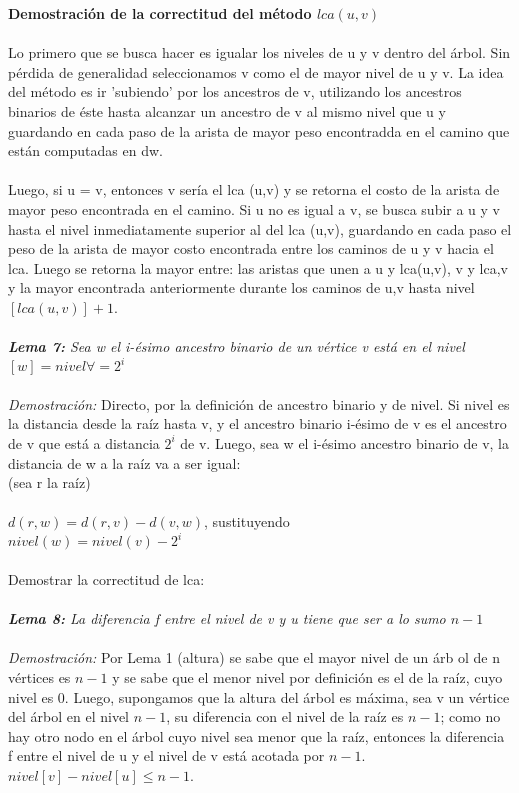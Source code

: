\documentclass[12pt]{article}
\begin{document}
\textbf{Demostraci\'on de la correctitud del m\'etodo $lca(u, v)$}\\
\\
Lo primero que se busca hacer es igualar los niveles de u y v dentro del \'arbol. Sin p\'erdida de generalidad seleccionamos v como el de mayor nivel de u y v. La idea del m\'etodo es ir 'subiendo' por los ancestros de v, utilizando los ancestros binarios de \'este hasta alcanzar un ancestro de v al mismo nivel 	que u y guardando en cada paso de la arista de mayor peso encontradda en el camino que est\'an computadas en dw.\\
\\
Luego, si u = v, entonces v ser\'ia el lca (u,v) y se retorna el costo de la arista de mayor peso encontrada en el camino.  Si u no es igual a v, se busca subir  a u y v hasta el nivel inmediatamente superior al del lca (u,v), guardando en cada paso el peso de la arista de mayor costo encontrada entre
los caminos de u y v hacia el lca.  Luego se retorna la mayor entre: las aristas que unen a u y lca(u,v), v y lca,v y la mayor encontrada anteriormente durante los caminos de u,v hasta nivel $[lca (u,v)] + 1$. \\
\\


\textit{ \textbf{Lema 7:} Sea w el i-\'esimo ancestro binario de un v\'ertice v est\'a en  el nivel $[w] = nivel\forall = 2^i$}\\
\\
\textit{Demostración:} Directo, por la definici\'on de ancestro binario y de nivel.  Si nivel es la distancia desde la ra\'iz hasta v, y el ancestro binario i-\'esimo de v es el ancestro de v que est\'a a distancia $2^i$ de v. Luego,  sea w el i-\'esimo ancestro binario de v, la distancia de w a la ra\'iz va a ser igual:\\
(sea r la ra\'iz)\\
\\
                    $d(r,w) = d(r,v) - d(v,w)$, sustituyendo\\
                    $nivel(w) = nivel (v) - 2^i$\\
\\
Demostrar la correctitud de lca: \\
\\


\textit{ \textbf{Lema 8:} La diferencia f entre el nivel de v y u tiene que ser a lo sumo $n-1$}\\
\\
\textit{Demostración:} Por Lema 1 (altura) se sabe que el mayor nivel de un \'arb ol de n v\'ertices es $n-1$ y se sabe que el menor nivel por definici\'on es el de la ra\'iz, cuyo nivel es 0.  Luego, supongamos que la altura del \'arbol es m\'axima, sea v un v\'ertice del \'arbol en el nivel $n-1$, su diferencia con el nivel de la ra\'iz es $n-1$;  como no hay otro nodo en el \'arbol cuyo nivel sea menor que la ra\'iz, entonces la diferencia f entre el nivel de u y  el nivel de v est\'a acotada por $n-1$.\\
$nivel [v] - nivel [u] \leq n-1$.\\
\\
\end{document}
